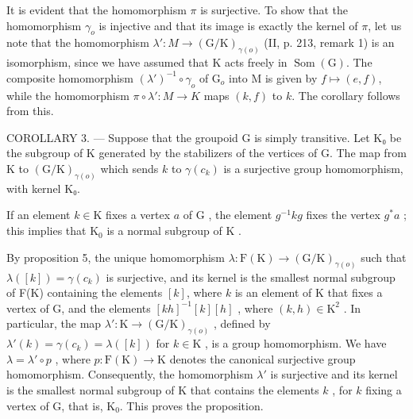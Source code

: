 It is evident that the homomorphism \(\pi\) is surjective. To show that the homomorphism \(\gamma_{o}\) is injective and that its image is exactly the kernel of \(\pi\), let us note that the homomorphism \(\lambda'\colon M \to (\mathrm{G}/\mathrm{K})_{\gamma(o)}\) (II, p. 213, remark 1) is an isomorphism, since we have assumed that K acts freely in \(\operatorname{Som}(\mathrm{G})\). The composite homomorphism \((\lambda')^{-1} \circ \gamma_{o}\) of \(\mathrm{G}_{o}\) into M is given by \(f \mapsto (e, f)\), while the homomorphism \(\pi \circ \lambda'\colon M \to K\) maps \((k, f)\) to \(k\). The corollary follows from this.

COROLLARY 3. --- Suppose that the groupoid G is simply transitive. Let K₀ be the subgroup of K generated by the stabilizers of the vertices of G. The map from K to \((\mathrm{G}/\mathrm{K})_{\gamma(o)}\) which sends \(k\) to \(\gamma(c_k)\) is a surjective group homomorphism, with kernel K₀.

If an element \(k \in \mathrm{K}\) fixes a vertex \(a\) of \(\mathrm{G}\) , the element \(g^{-1}kg\) fixes the vertex \(g^{*}a\) ; this implies that \(\mathrm{K}_{0}\) is a normal subgroup of \(\mathrm{K}\) .

By proposition 5, the unique homomorphism \(\lambda\colon\mathrm{F}(\mathrm{K})\to(\mathrm{G}/\mathrm{K})_{\gamma(o)}\) such that \(\lambda([k])=\gamma(c_k)\) is surjective, and its kernel is the smallest normal subgroup of F(K) containing the elements \([k]\), where \(k\) is an element of K that fixes a vertex of G, and the elements \([kh]^{-1}[k][h]\) , where \((k,h)\in\mathrm{K}^2\) . In particular, the map \(\lambda'\colon\mathrm{K}\to(\mathrm{G}/\mathrm{K})_{\gamma(o)}\) , defined by \(\lambda'(k)=\gamma(c_k)=\lambda([k])\) for \(k\in\mathrm{K}\) , is a group homomorphism. We have \(\lambda=\lambda'\circ p\) , where \(p\colon\mathrm{F}(\mathrm{K})\to\mathrm{K}\) denotes the canonical surjective group homomorphism. Consequently, the homomorphism \(\lambda'\) is surjective and its kernel is the smallest normal subgroup of K that contains the elements \(k\) , for \(k\) fixing a vertex of G, that is, \(\mathrm{K}_0\). This proves the proposition.
